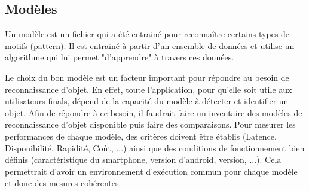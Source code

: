 \documentclass[UTF8]{EPURapport}
\begin{document}
\subsection{Modèles}
Un modèle est un fichier qui a été entrainé pour reconnaître certains types de motifs (pattern). Il est entrainé à partir d'un ensemble de données et utilise un algorithme qui lui permet "d'apprendre" à travers ces données. 

Le choix du bon modèle est un facteur important pour répondre au besoin de reconnaissance d'objet. En effet, toute l’application, pour qu'elle soit utile aux utilisateurs finals, dépend de la capacité du modèle à détecter et identifier un objet. Afin de répondre à ce besoin, il faudrait faire un inventaire des modèles de reconnaissance d'objet disponible puis faire des comparaisons. Pour mesurer les performances de chaque modèle, des critères doivent être établis (Latence, Disponibilité, Rapidité, Coût, ...) ainsi que des conditions de fonctionnement bien définis (caractéristique du smartphone, version d'android, version, ...). Cela permettrait d'avoir un environnement d'exécution commun pour chaque modèle et donc des mesures cohérentes.
\end{document}
